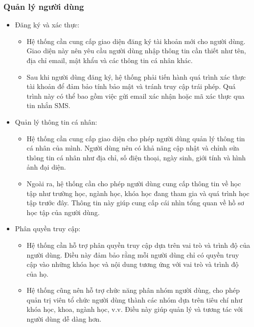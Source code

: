 \documentclass[../Thesis.tex]{subfiles}
\begin{document}
        \subsubsection{Quản lý người dùng}
            \begin{itemize}
                \item Đăng ký và xác thực:
                    \begin{itemize}
                        \item Hệ thống cần cung cấp giao diện đăng ký tài khoản mới cho người dùng. Giao diện này nên yêu cầu người dùng nhập thông tin cần thiết như tên, địa chỉ email, mật khẩu và các thông tin cá nhân khác.
                        \item Sau khi người dùng đăng ký, hệ thống phải tiến hành quá trình xác thực tài khoản để đảm bảo tính bảo mật và tránh truy cập trái phép. Quá trình này có thể bao gồm việc gửi email xác nhận hoặc mã xác thực qua tin nhắn SMS.
                    \end{itemize}

                \item Quản lý thông tin cá nhân:
                    \begin{itemize}
                        \item Hệ thống cần cung cấp giao diện cho phép người dùng quản lý thông tin cá nhân của mình. Người dùng nên có khả năng cập nhật và chỉnh sửa thông tin cá nhân như địa chỉ, số điện thoại, ngày sinh, giới tính và hình ảnh đại diện.
                        \item Ngoài ra, hệ thống cần cho phép người dùng cung cấp thông tin về học tập như trường học, ngành học, khóa học đang tham gia và quá trình học tập trước đây. Thông tin này giúp cung cấp cái nhìn tổng quan về hồ sơ học tập của người dùng.
                    \end{itemize}

                \item Phân quyền truy cập:
                    \begin{itemize}
                        \item Hệ thống cần hỗ trợ phân quyền truy cập dựa trên vai trò và trình độ của người dùng. Điều này đảm bảo rằng mỗi người dùng chỉ có quyền truy cập vào những khóa học và nội dung tương ứng với vai trò và trình độ của họ.

                        \item Hệ thống cũng nên hỗ trợ chức năng phân nhóm người dùng, cho phép quản trị viên tổ chức người dùng thành các nhóm dựa trên tiêu chí như khóa học, khoa, ngành học, v.v. Điều này giúp quản lý và tương tác với người dùng dễ dàng hơn.
                    \end{itemize}


\end{itemize}
\end{document}
